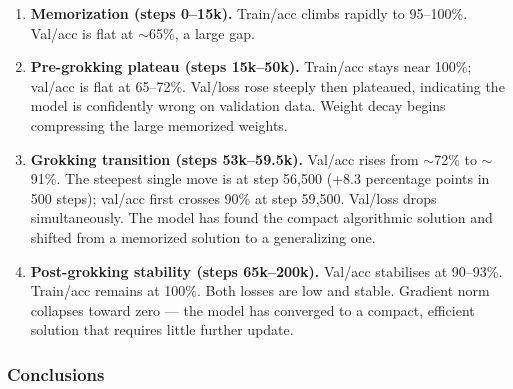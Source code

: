 \documentclass[11pt, a4paper]{article}
\begin{document}
\begin{enumerate}[noitemsep]
  \item \textbf{Memorization (steps 0--15k).} Train/acc climbs rapidly to
        95--100\%. Val/acc is flat at $\sim$65\%, a large gap.

  \item \textbf{Pre-grokking plateau (steps 15k--50k).} Train/acc stays
        near 100\%; val/acc is flat at 65--72\%. Val/loss rose steeply then
        plateaued, indicating the model is confidently wrong on validation
        data. Weight decay begins compressing the large memorized weights.

  \item \textbf{Grokking transition (steps 53k--59.5k).} Val/acc rises from
        $\sim$72\% to $\sim$91\%. The steepest single move is at step 56{,}500
        (+8.3 percentage points in 500 steps); val/acc first crosses 90\% at
        step 59{,}500. Val/loss drops simultaneously. The model has found the
        compact algorithmic solution and shifted from a memorized solution to a
        generalizing one.

  \item \textbf{Post-grokking stability (steps 65k--200k).} Val/acc stabilises
        at 90--93\%. Train/acc remains at 100\%. Both losses are low and
        stable. Gradient norm collapses toward zero --- the model has converged
        to a compact, efficient solution that requires little further update.
\end{enumerate}

\subsubsection{Conclusions}
\end{document}
